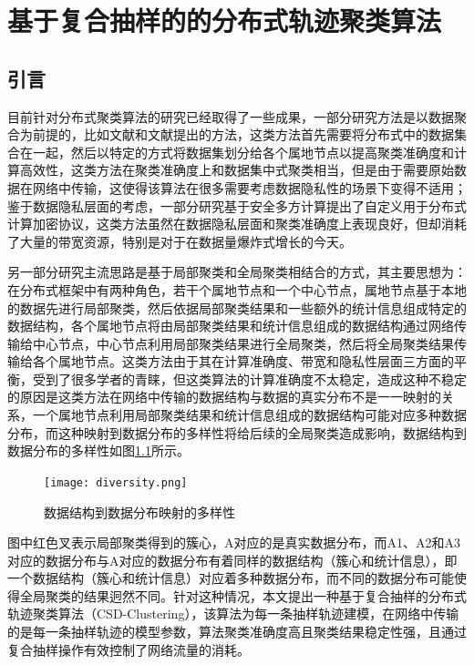 \chapter{基于复合抽样的的分布式轨迹聚类算法}


\section{引言}
目前针对分布式聚类算法的研究已经取得了一些成果，一部分研究方法是以数据聚合为前提的，比如文献\cite{FanA}和文献\cite{Wang2018A}提出的方法，这类方法首先需要将分布式中的数据集合在一起，然后以特定的方式将数据集划分给各个属地节点以提高聚类准确度和计算高效性，这类方法在聚类准确度上和数据集中式聚类相当，但是由于需要原始数据在网络中传输，这使得该算法在很多需要考虑数据隐私性的场景下变得不适用；鉴于数据隐私层面的考虑，一部分研究基于安全多方计算提出了自定义用于分布式计算加密协议，这类方法虽然在数据隐私层面和聚类准确度上表现良好，但却消耗了大量的带宽资源，特别是对于在数据量爆炸式增长的今天。

另一部分研究主流思路是基于局部聚类和全局聚类相结合的方式，其主要思想为：在分布式框架中有两种角色，若干个属地节点和一个中心节点，属地节点基于本地的数据先进行局部聚类，然后依据局部聚类结果和一些额外的统计信息组成特定的数据结构，各个属地节点将由局部聚类结果和统计信息组成的数据结构通过网络传输给中心节点，中心节点利用局部聚类结果进行全局聚类，然后将全局聚类结果传输给各个属地节点。这类方法由于其在计算准确度、带宽和隐私性层面三方面的平衡，受到了很多学者的青睐，但这类算法的计算准确度不太稳定，造成这种不稳定的原因是这类方法在网络中传输的数据结构与数据的真实分布不是一一映射的关系，一个属地节点利用局部聚类结果和统计信息组成的数据结构可能对应多种数据分布，而这种映射到数据分布的多样性将给后续的全局聚类造成影响，数据结构到数据分布的多样性如图\ref{diversity}所示。
\begin{figure}[h]
	\texttt{[image: diversity.png]}
	\caption{数据结构到数据分布映射的多样性}
	\label{diversity}
\end{figure}

图中红色叉表示局部聚类得到的簇心，A对应的是真实数据分布，而A1、A2和A3对应的数据分布与A对应的数据分布有着同样的数据结构（簇心和统计信息），即一个数据结构（簇心和统计信息）对应着多种数据分布，而不同的数据分布可能使得全局聚类的结果迥然不同。针对这种情况，本文提出一种基于复合抽样的分布式轨迹聚类算法（CSD-Clustering），该算法为每一条抽样轨迹建模，在网络中传输的是每一条抽样轨迹的模型参数，算法聚类准确度高且聚类结果稳定性强，且通过复合抽样操作有效控制了网络流量的消耗。

